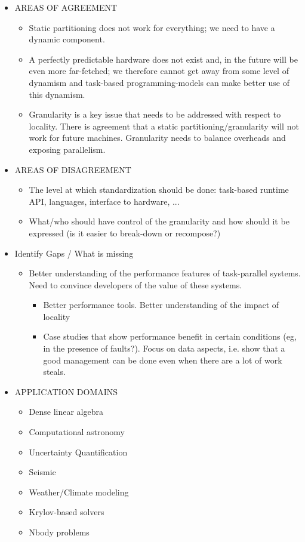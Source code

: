 \begin{itemize}
			
			
	\item AREAS OF AGREEMENT
		  \begin{itemize}
		  \item Static partitioning does not work for everything; we need to
		      have a dynamic component.
		  \item A perfectly predictable hardware does not exist and, in the
		      future will be even more far-fetched; we therefore cannot get
		      away from some level of dynamism and task-based
		      programming-models can make better use of this dynamism.
		  \item Granularity is a key issue that needs to be addressed with
		      respect to locality. There is agreement that a static
		      partitioning/granularity will not work for future
		      machines. Granularity needs to balance overheads and exposing
		      parallelism.
		  \end{itemize}
	
	
	
	\item AREAS OF DISAGREEMENT
		  \begin{itemize}
		  \item The level at which standardization should be done: task-based
		      runtime API, languages, interface to hardware, ...
		  \item What/who should have control of the granularity and how should
		      it be expressed (is it easier to break-down or recompose?)
		  \end{itemize}


	\item Identify Gaps / What is missing
	    \begin{itemize}
		
		\item Better understanding of the performance features of task-parallel
		systems. Need to convince developers of the value of these systems. 
		\begin{itemize}
		  \item Better performance tools. Better understanding of the impact of locality
		  \item Case studies that show performance benefit in certain conditions (eg,
		    in the presence of faults?). Focus on data aspects, i.e. show that
		a good management can be done even when there are a lot of work steals. 
	      \end{itemize}  
	  \end{itemize}  

	\item APPLICATION DOMAINS
		\begin{itemize}
			\item Dense linear algebra
			\item Computational astronomy
			\item Uncertainty Quantification
			\item Seismic
			\item Weather/Climate modeling
			\item Krylov-based solvers
			\item Nbody problems
		\end{itemize}

\end{itemize}


